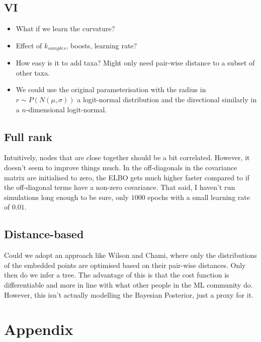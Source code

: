 \documentclass[11pt]{article}
\begin{document}
\subsection{VI}
\begin{itemize}
\item What if we learn the curvature?
\item Effect of $k_{samples}$, boosts, learning rate?
\item How easy is it to add taxa? Might only need pair-wise distance to a subset of other taxa.
\item We could use the original parameterisation with the radius in $r \sim P(N(\mu, \sigma))$ a logit-normal distribution and the directional similarly in a $n$-dimensional logit-normal.
\end{itemize}

\subsection{Full rank}
Intuitively, nodes that are close together should be a bit correlated. However, it doesn't seem to improve things much. In the off-diagonals in the covariance matrix are initialised to zero, the ELBO gets much higher faster compared to if the off-diagonal terms have a non-zero covariance. That said, I haven't run simulations long enough to be sure, only $1000$ epochs with a small learning rate of $0.01$.

\subsection{Distance-based}
Could we adopt an approach like Wilson and Chami, where only the distributions of the embedded points are optimised based on their pair-wise distances.
Only then do we infer a tree.
The advantage of this is that the cost function is differentiable and more in line with what other people in the ML community do.
However, this isn't actually modelling the Bayesian Posterior, just a proxy for it.

\section{Appendix}
\end{document}
